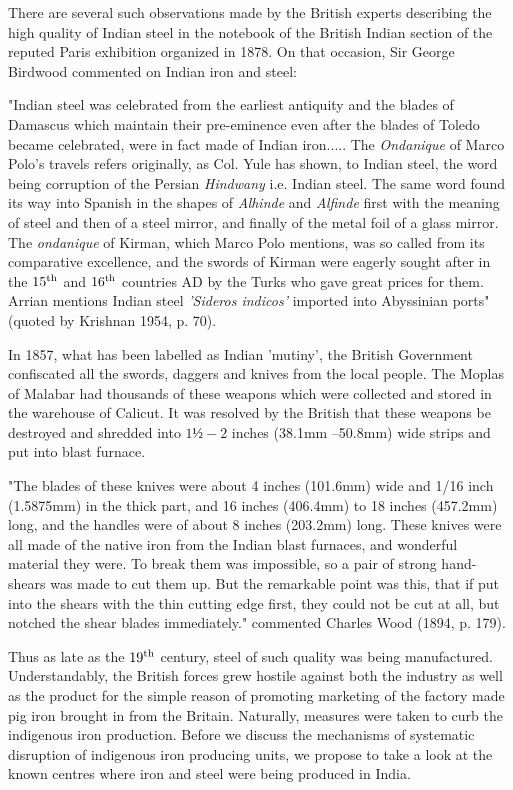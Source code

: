 There are several such observations made by the British experts describing the high quality of Indian steel in the notebook of the British Indian section of the reputed Paris exhibition organized in 1878. On that occasion, Sir George Birdwood commented on Indian iron and steel:

"Indian steel was celebrated from the earliest antiquity and the blades of Damascus which maintain their pre-eminence even after the blades of Toledo became celebrated, were in fact made of Indian iron..... The {\it Ondanique} of Marco Polo's travels refers originally, as Col. Yule has shown, to Indian steel, the word being corruption of the Persian {\it Hindwany} i.e. Indian steel.  The same word found its way into Spanish in the shapes of {\it Alhinde} and {\it Alfinde} first with the meaning of steel and then of a steel mirror, and finally of the metal foil of a glass mirror.  The {\it ondanique} of Kirman, which Marco Polo mentions, was so called from its comparative excellence, and the swords of Kirman were eagerly sought after in the $15^{\rm th}$ and $16^{\rm th}$ countries AD by the Turks who gave great prices for them.  Arrian mentions Indian steel {\it 'Sideros indicos'} imported into Abyssinian ports" (quoted by Krishnan 1954, p. 70).

In 1857, what has been labelled as Indian 'mutiny', the British Government confiscated all the swords, daggers and knives from the local people.  The Moplas of Malabar had thousands of these weapons which were collected and stored in the warehouse of Calicut. It was resolved by the British that these weapons be destroyed and shredded into $1½ - 2$ inches (38.1mm –50.8mm) wide strips and put into blast furnace. 

"The blades of these knives were about 4 inches (101.6mm) wide and 1/16 inch (1.5875mm) in the thick part, and 16 inches (406.4mm) to 18 inches (457.2mm) long, and the handles were of about 8 inches (203.2mm) long.  These knives were all made of the native iron from the Indian blast furnaces, and wonderful material they were.  To break them was impossible, so a pair of strong hand-shears was made to cut them up.  But the remarkable point was this, that if put into the shears with the thin cutting edge first, they could not be cut at all, but notched the shear blades immediately."  commented Charles Wood (1894, p. 179).  

Thus as late as the $19^{\rm th}$ century, steel of such quality was being manufactured. Understandably, the British forces grew hostile against both the industry as well as the product for the simple reason of promoting marketing of the factory made pig iron brought in from the Britain. Naturally, measures were taken to curb the indigenous iron production. Before we discuss the mechanisms of systematic disruption of indigenous iron producing units, we propose to take a look at the known centres where iron and steel were being produced in India. 

